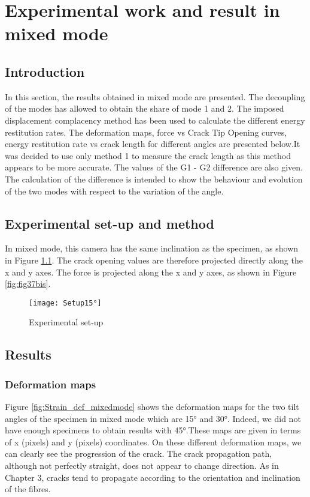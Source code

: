 \chapter{Experimental work and result in mixed mode}
\label{Chapter2}

\section{Introduction}

In this section, the results obtained in mixed mode are presented. The decoupling of the modes has allowed to obtain the share of mode 1 and 2. The imposed displacement complacency method has been used to calculate the different energy restitution rates. The deformation maps, force vs Crack Tip Opening curves, energy restitution rate vs crack length for different angles are presented below.It was decided to use only method 1 to measure the crack length as this method appears to be more accurate. The values of the G1 - G2 difference are also given. The calculation of the difference is intended to show the behaviour and evolution of the two modes with respect to the variation of the angle.

\section{Experimental set-up and method}

In mixed mode, this camera has the same inclination as the specimen, as shown in Figure \ref{fig:Setup15°}. The crack opening values are therefore projected directly along the x and y axes. The force is projected along the x and y axes, as shown in Figure \ref{fig:fig37bis}.

\begin{figure}[htp]
	\centering
	\texttt{[image: Setup15°]}
	\caption{Experimental set-up}
	\label{fig:Setup15°}
\end{figure}

\section{Results}

\subsection{Deformation maps}

Figure \ref{fig:Strain_def_mixedmode} shows the deformation maps for the two tilt angles of the specimen in mixed mode which are 15° and 30°. Indeed, we did not have enough specimens to obtain results with 45°.These maps are given in terms of x (pixels) and y (pixels) coordinates. On these different deformation maps, we can clearly see the progression of the crack. The crack propagation path, although not perfectly straight, does not appear to change direction. As in Chapter 3, cracks tend to propagate according to the orientation and inclination of the fibres.

